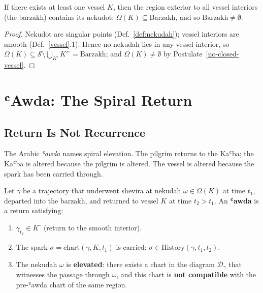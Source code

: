 \begin{theorem}\label{barzakh}
If there exists at least one vessel $K$, then the region exterior to all vessel interiors (the barzakh) contains its nekudot: $\Omega(K) \subseteq \mathrm{Barzakh}$, and so $\mathrm{Barzakh} \neq \emptyset$.
\end{theorem}
\begin{proof}
Nekudot are singular points (Def.~\ref{def:nekudah}); vessel interiors are smooth (Def.~\ref{vessel}.1). Hence no nekudah lies in any vessel interior, so $\Omega(K) \subseteq \mathcal{S} \setminus \bigcup_{K'} K'^{\circ} = \mathrm{Barzakh}$; and $\Omega(K) \neq \emptyset$ by Postulate~\ref{no-closed-vessel}.
\end{proof}

\section{ʿAwda: The Spiral Return}
\label{sec:awda}

\subsection{Return Is Not Recurrence}

The Arabic \emph{ʿawda} names spiral elevation. The pilgrim returns to the Kaʿba; the Kaʿba is altered because the pilgrim is altered. The vessel is altered because the spark has been carried through.

\begin{definition}\label{awda}
Let $\gamma$ be a trajectory that underwent shevira at nekudah $\omega \in \Omega(K)$ at time $t_1$, departed into the barzakh, and returned to vessel $K$ at time $t_2 > t_1$. An \textbf{ʿawda} is a return satisfying:
\begin{enumerate}
    \item $\gamma_{t_2} \in K^{\circ}$ (return to the smooth interior).
    \item The spark $\sigma = \mathrm{chart}(\gamma, K, t_1)$ is carried: $\sigma \in \mathrm{History}(\gamma, t_1, t_2)$.
    \item The nekudah $\omega$ is \textbf{elevated}: there exists a chart in the diagram $\mathcal{D}_\gamma$ that witnesses the passage through $\omega$, and this chart is \textbf{not compatible} with the pre-ʿawda chart of the same region.
\end{enumerate}
\end{definition}

